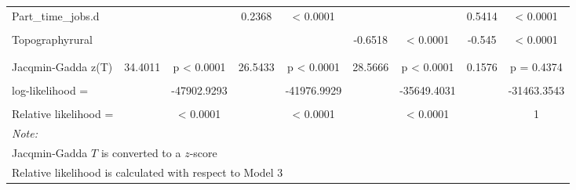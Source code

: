 \documentclass[smallextended]{svjour3}       %
\begin{document}
\begin{landscape}
\begin{table}
{\begin{tabular}[t]{lcccccccc}
Part\_time\_jobs.d &  &  & 0.2368 & < 0.0001 &  &  & 0.5414 & < 0.0001\\
\cellcolor{gray!6}{Topographylower city - rural} & \cellcolor{gray!6}{} & \cellcolor{gray!6}{} & \cellcolor{gray!6}{} & \cellcolor{gray!6}{} & \cellcolor{gray!6}{-2.53} & \cellcolor{gray!6}{< 0.0001} & \cellcolor{gray!6}{-2.4021} & \cellcolor{gray!6}{< 0.0001}\\
Topographyrural &  &  &  &  & -0.6518 & < 0.0001 & -0.545 & < 0.0001\\
\cellcolor{gray!6}{quietest\_distance} & \cellcolor{gray!6}{} & \cellcolor{gray!6}{} & \cellcolor{gray!6}{} & \cellcolor{gray!6}{} & \cellcolor{gray!6}{-0.3253} & \cellcolor{gray!6}{< 0.0001} & \cellcolor{gray!6}{-0.345} & \cellcolor{gray!6}{< 0.0001}\\
\addlinespace[2em]
\multicolumn{9}{l}{\textbf{Model diagnostics}}\\
\hspace{1em}Jacqmin-Gadda z(T) & 34.4011 & p < 0.0001 & 26.5433 & p < 0.0001 & 28.5666 & p < 0.0001 & 0.1576 & p =  0.4374\\
\hspace{1em}\cellcolor{gray!6}{n =} & \cellcolor{gray!6}{} & \cellcolor{gray!6}{9801} & \cellcolor{gray!6}{} & \cellcolor{gray!6}{9801} & \cellcolor{gray!6}{} & \cellcolor{gray!6}{9801} & \cellcolor{gray!6}{} & \cellcolor{gray!6}{9801}\\
\hspace{1em}log-likelihood = &  & -47902.9293 &  & -41976.9929 &  & -35649.4031 &  & -31463.3543\\
\hspace{1em}\cellcolor{gray!6}{AIC =} & \cellcolor{gray!6}{} & \cellcolor{gray!6}{95807.8587} & \cellcolor{gray!6}{} & \cellcolor{gray!6}{83993.9858} & \cellcolor{gray!6}{} & \cellcolor{gray!6}{71306.8063} & \cellcolor{gray!6}{} & \cellcolor{gray!6}{62972.7087}\\
\hspace{1em}Relative likelihood = &  & < 0.0001 &  & < 0.0001 &  & < 0.0001 &  & 1\\
\bottomrule
\multicolumn{9}{l}{\rule{0pt}{1em}\textit{Note: }}\\
\multicolumn{9}{l}{\rule{0pt}{1em}Jacqmin-Gadda $T$ is converted to a $z$-score}\\
\multicolumn{9}{l}{\rule{0pt}{1em}Relative likelihood is calculated with respect to Model 3}\\
\end{tabular}}
\end{table}
\end{landscape}
\end{document}
